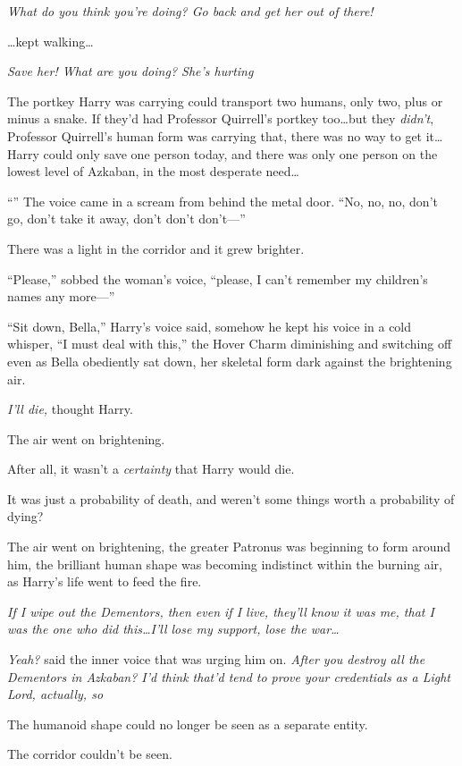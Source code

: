 \emph{What do you think you’re doing? Go back and get her out of there!}

…kept walking…

\emph{Save her! What are you doing? She’s hurting }

The portkey Harry was carrying could transport two humans, only two, plus or minus a snake. If they’d had Professor Quirrell’s portkey too…but they \emph{didn’t}, Professor Quirrell’s human form was carrying that, there was no way to get it…Harry could only save one person today, and there was only one person on the lowest level of Azkaban, in the most desperate need…

“” The voice came in a scream from behind the metal door. “No, no, no, don’t go, don’t take it away, don’t don’t don’t—”

There was a light in the corridor and it grew brighter.

“Please,” sobbed the woman’s voice, “please, I can’t remember my children’s names any more—”

“Sit down, Bella,” Harry’s voice said, somehow he kept his voice in a cold whisper, “I must deal with this,” the Hover Charm diminishing and switching off even as Bella obediently sat down, her skeletal form dark against the brightening air.

\emph{I’ll die,} thought Harry.

The air went on brightening.

After all, it wasn’t a \emph{certainty} that Harry would die.

It was just a probability of death, and weren’t some things worth a probability of dying?

The air went on brightening, the greater Patronus was beginning to form around him, the brilliant human shape was becoming indistinct within the burning air, as Harry’s life went to feed the fire.

\emph{If I wipe out the Dementors, then even if I live, they’ll know it was me, that I was the one who did this…I’ll lose my support, lose the war…}

\emph{Yeah?} said the inner voice that was urging him on. \emph{After you destroy all the Dementors in Azkaban? I’d think that’d tend to prove your credentials as a Light Lord, actually, so }

The humanoid shape could no longer be seen as a separate entity.

The corridor couldn’t be seen.

